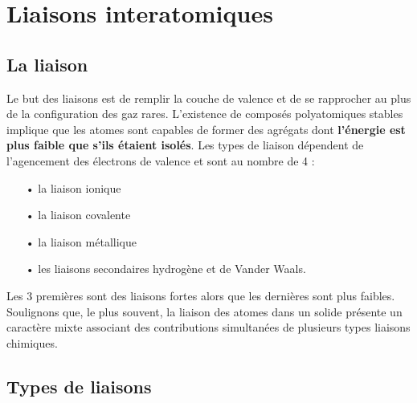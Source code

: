 
\chapter{Liaisons interatomiques}
\section{La liaison}
	Le but des liaisons est de remplir la couche de valence et de se rapprocher au plus de la configuration des gaz rares. L'existence de composés polyatomiques stables implique que les atomes sont capables de former des agrégats dont \textbf{l'énergie est plus faible que s'ils étaient isolés}. Les types de liaison dépendent de l'agencement des électrons de valence et sont au nombre de 4 : \\

\begin{itemize}
	\item[•] la liaison ionique
	\item[•] la liaison covalente
	\item[•] la liaison métallique
	\item[•] les liaisons secondaires hydrogène et de Vander Waals. \\
\end{itemize}
	
Les 3 premières sont des liaisons fortes alors que les dernières sont plus faibles. Soulignons que, le plus souvent, la liaison des atomes dans un solide présente un caractère mixte associant des contributions simultanées de plusieurs types liaisons chimiques.

\section{Types de liaisons}
